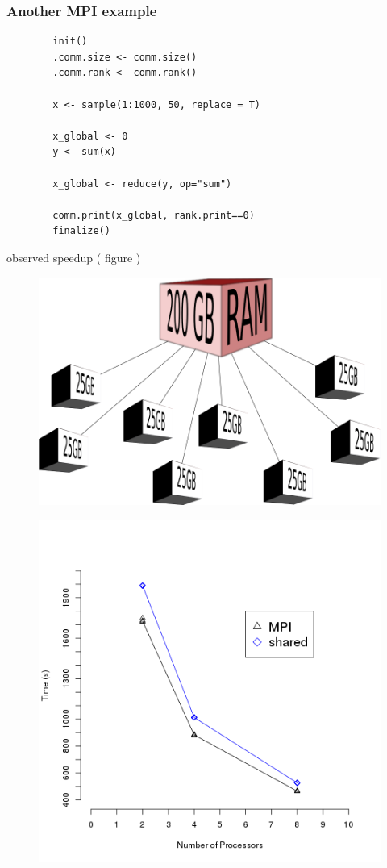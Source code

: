 \begin{frame}[fragile]
		\frametitle{Another MPI example}
		\begin{verbatim}
		init()
		.comm.size <- comm.size()
		.comm.rank <- comm.rank()

		x <- sample(1:1000, 50, replace = T)

		x_global <- 0
		y <- sum(x)

		x_global <- reduce(y, op="sum")

		comm.print(x_global, rank.print==0)
		finalize()
		\end{verbatim}
\end{frame}

\begin{frame}
		observed speedup ( figure )
\end{frame}

\begin{frame}
		\begin{figure}
				\includegraphics[width=0.8\linewidth]{figures/diagrams/splitmem/memsplit}
		\end{figure}
\end{frame}

\begin{frame}
		\begin{figure}
				\includegraphics[width=0.8\linewidth]{figures/diagrams/comparison/comparison}
		\end{figure}
\end{frame}

